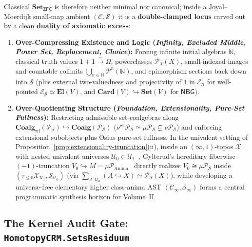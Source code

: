 Classical $\mathbf{Set}_{\mathsf{ZFC}}$ is therefore neither minimal nor canonical; inside a Joyal--Moerdijk small-map ambient $(\mathcal{C}, \mathcal{S})$ it is a \textbf{double-clamped locus} carved out by a clean \textbf{duality of axiomatic excess}:
\begin{enumerate}[label=\textup{\arabic*.},leftmargin=1.8em]
  \item \textbf{Over-Compressing Existence and Logic (\emph{Infinity, Excluded Middle, Power Set, Replacement, Choice}):} Forcing infinite initial algebras $\mathbb{N}$, classical truth values $1 + 1 \xrightarrow{\sim} \Omega$, powerclasses $\mathcal{P}_{\mathcal{S}}(X)$, small-indexed images and countable colimits $\bigcup_{n \in \mathbb{N}} \mathcal{P}^n(\mathbb{N})$, and epimorphism sections back down into $\mathcal{S}$ (plus external two-valuedness and projectivity of $1$ in $\mathcal{E}_{\mathcal{S}}$ for well-pointed $\mathcal{E}_{\mathcal{S}} \simeq \mathbf{El}(V)$, and $\mathbf{Card}(V) \hookrightarrow \mathbf{Set}(V)$ for $\mathsf{NBG}$).
  \item \textbf{Over-Quotienting Structure (\emph{Foundation, Extensionality, Pure-Set Fullness}):} Restricting admissible set-coalgebras along $\mathbf{Coalg}_{\mathrm{wf}}(\mathcal{P}_{\mathcal{S}}) \hookrightarrow \mathbf{Coalg}(\mathcal{P}_{\mathcal{S}})$ ($\nu^{\mathrm{wf}} \mathcal{P}_{\mathcal{S}} \simeq \mu \mathcal{P}_{\mathcal{S}} \subsetneq \nu \mathcal{P}_{\mathcal{S}}$) and enforcing extensional subobjects plus Osius pure-set fullness. In the univalent setting of Proposition~\ref{prop:extensionality-truncation}(ii), inside an $(\infty, 1)$-topos $\mathcal{X}$ with nested univalent universes $\mathcal{U}_0 \in \mathcal{U}_1$~\cite[\S 6.1.6]{Lurie09}, Gylterud's hereditary fiberwise $(-1)$-truncation $V_0 \hookrightarrow M = \mu \mathcal{P}_{\mathrm{Anima}}$~\cite[Thm.~3.9]{Gylterud18} directly realizes $V_0 \cong \mu \mathcal{P}_{\mathcal{S}}$ inside $(\tau_{\le 0}\mathcal{X}_{\mathcal{U}_1}, \mathcal{S}_{\mathcal{U}_0})$ (via $\sum_{A : \mathcal{U}_0} (A \hookrightarrow X) \simeq \mathcal{P}_{\mathcal{S}}(X)$), while developing a universe-free elementary higher class-anima AST $(\mathcal{C}_\infty, \mathcal{S}_\infty)$ forms a central programmatic synthesis horizon for Volume~II.
\end{enumerate}

\subsection{\texorpdfstring{The Kernel Audit Gate: \texttt{HomotopyCRM.SetsResiduum}}{The Kernel Audit Gate: HomotopyCRM.SetsResiduum}}\label{subsec:sets-residuum-kernel-gate}

